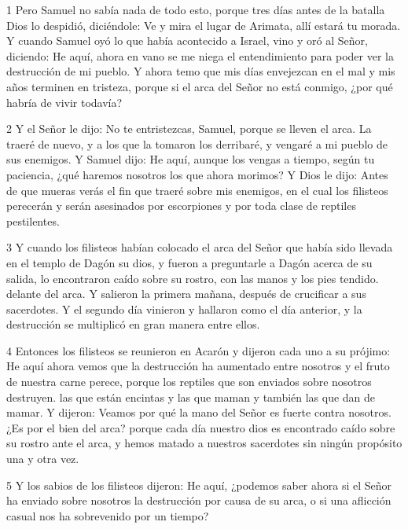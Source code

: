 \par 1 Pero Samuel no sabía nada de todo esto, porque tres días antes de la batalla Dios lo despidió, diciéndole: Ve y mira el lugar de Arimata, allí estará tu morada. Y cuando Samuel oyó lo que había acontecido a Israel, vino y oró al Señor, diciendo: He aquí, ahora en vano se me niega el entendimiento para poder ver la destrucción de mi pueblo. Y ahora temo que mis días envejezcan en el mal y mis años terminen en tristeza, porque si el arca del Señor no está conmigo, ¿por qué habría de vivir todavía?

\par 2 Y el Señor le dijo: No te entristezcas, Samuel, porque se lleven el arca. La traeré de nuevo, y a los que la tomaron los derribaré, y vengaré a mi pueblo de sus enemigos. Y Samuel dijo: He aquí, aunque los vengas a tiempo, según tu paciencia, ¿qué haremos nosotros los que ahora morimos? Y Dios le dijo: Antes de que mueras verás el fin que traeré sobre mis enemigos, en el cual los filisteos perecerán y serán asesinados por escorpiones y por toda clase de reptiles pestilentes.

\par 3 Y cuando los filisteos habían colocado el arca del Señor que había sido llevada en el templo de Dagón su dios, y fueron a preguntarle a Dagón acerca de su salida, lo encontraron caído sobre su rostro, con las manos y los pies tendido. delante del arca. Y salieron la primera mañana, después de crucificar a sus sacerdotes. Y el segundo día vinieron y hallaron como el día anterior, y la destrucción se multiplicó en gran manera entre ellos.

\par 4 Entonces los filisteos se reunieron en Acarón y dijeron cada uno a su prójimo: He aquí ahora vemos que la destrucción ha aumentado entre nosotros y el fruto de nuestra carne perece, porque los reptiles que son enviados sobre nosotros destruyen. las que están encintas y las que maman y también las que dan de mamar. Y dijeron: Veamos por qué la mano del Señor es fuerte contra nosotros. ¿Es por el bien del arca? porque cada día nuestro dios es encontrado caído sobre su rostro ante el arca, y hemos matado a nuestros sacerdotes sin ningún propósito una y otra vez.

\par 5 Y los sabios de los filisteos dijeron: He aquí, ¿podemos saber ahora si el Señor ha enviado sobre nosotros la destrucción por causa de su arca, o si una aflicción casual nos ha sobrevenido por un tiempo?


